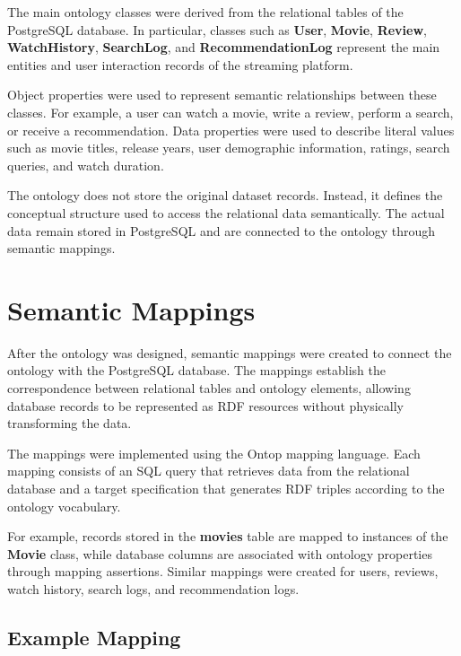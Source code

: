 The main ontology classes were derived from the relational tables of the PostgreSQL database. In particular, classes such as \textbf{User}, \textbf{Movie}, \textbf{Review}, \textbf{WatchHistory}, \textbf{SearchLog}, and \textbf{RecommendationLog} represent the main entities and user interaction records of the streaming platform.

Object properties were used to represent semantic relationships between these classes. For example, a user can watch a movie, write a review, perform a search, or receive a recommendation. Data properties were used to describe literal values such as movie titles, release years, user demographic information, ratings, search queries, and watch duration.

The ontology does not store the original dataset records. Instead, it defines the conceptual structure used to access the relational data semantically. The actual data remain stored in PostgreSQL and are connected to the ontology through semantic mappings.
\section{Semantic Mappings}

After the ontology was designed, semantic mappings were created to connect the ontology with the PostgreSQL database. The mappings establish the correspondence between relational tables and ontology elements, allowing database records to be represented as RDF resources without physically transforming the data.

The mappings were implemented using the Ontop mapping language. Each mapping consists of an SQL query that retrieves data from the relational database and a target specification that generates RDF triples according to the ontology vocabulary.

For example, records stored in the \textbf{movies} table are mapped to instances of the \textbf{Movie} class, while database columns are associated with ontology properties through mapping assertions. Similar mappings were created for users, reviews, watch history, search logs, and recommendation logs.


\subsection{Example Mapping}

